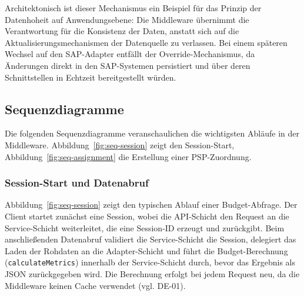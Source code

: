 Architektonisch ist dieser Mechanismus ein Beispiel für das Prinzip der Datenhoheit auf Anwendungsebene: Die Middleware übernimmt die Verantwortung für die Konsistenz der Daten, anstatt sich auf die Aktualisierungsmechanismen der Datenquelle zu verlassen. Bei einem späteren Wechsel auf den SAP-Adapter entfällt der Override-Mechanismus, da Änderungen direkt in den SAP-Systemen persistiert und über deren Schnittstellen in Echtzeit bereitgestellt würden.

\subsection{Sequenzdiagramme}

Die folgenden Sequenzdiagramme veranschaulichen die wichtigsten Abläufe in der Middleware. Abbildung~\ref{fig:seq-session} zeigt den Session-Start, Abbildung~\ref{fig:seq-assignment} die Erstellung einer PSP-Zuordnung.

\subsubsection{Session-Start und Datenabruf}

Abbildung~\ref{fig:seq-session} zeigt den typischen Ablauf einer Budget-Abfrage. Der Client startet zunächst eine Session, wobei die API-Schicht den Request an die Service-Schicht weiterleitet, die eine Session-ID erzeugt und zurückgibt. Beim anschließenden Datenabruf validiert die Service-Schicht die Session, delegiert das Laden der Rohdaten an die Adapter-Schicht und führt die Budget-Berechnung (\texttt{calculateMetrics}) innerhalb der Service-Schicht durch, bevor das Ergebnis als JSON zurückgegeben wird. Die Berechnung erfolgt bei jedem Request neu, da die Middleware keinen Cache verwendet (vgl. DE-01).

